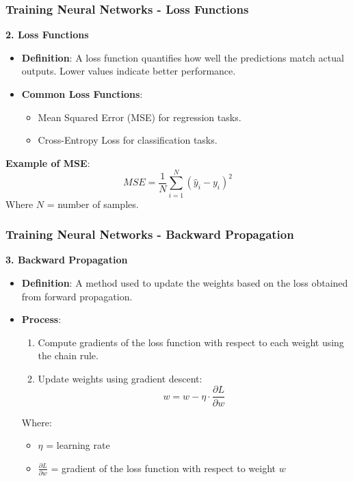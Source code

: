 \documentclass[aspectratio=169]{beamer}
\begin{document}
\begin{frame}[fragile]
  \frametitle{Training Neural Networks - Loss Functions}
  \textbf{2. Loss Functions}
  
  \begin{itemize}
    \item \textbf{Definition}: A loss function quantifies how well the predictions match actual outputs. Lower values indicate better performance.
    \item \textbf{Common Loss Functions}:
    \begin{itemize}
      \item Mean Squared Error (MSE) for regression tasks.
      \item Cross-Entropy Loss for classification tasks.
    \end{itemize}
  \end{itemize}
  \textbf{Example of MSE}:
  \begin{equation}
  MSE = \frac{1}{N}\sum_{i=1}^{N}(\hat{y}_i - y_i)^2
  \end{equation}
  Where \( N \) = number of samples.
\end{frame}

\begin{frame}[fragile]
  \frametitle{Training Neural Networks - Backward Propagation}
  \textbf{3. Backward Propagation}
  
  \begin{itemize}
    \item \textbf{Definition}: A method used to update the weights based on the loss obtained from forward propagation.
    \item \textbf{Process}:
      \begin{enumerate}
        \item Compute gradients of the loss function with respect to each weight using the chain rule.
        \item Update weights using gradient descent:
        \begin{equation}
        w = w - \eta \cdot \frac{\partial L}{\partial w}
        \end{equation}
      \end{enumerate}
      Where:
      \begin{itemize}
        \item \( \eta \) = learning rate
        \item \( \frac{\partial L}{\partial w} \) = gradient of the loss function with respect to weight \( w \)
      \end{itemize}
  \end{itemize}
\end{frame}
\end{document}
